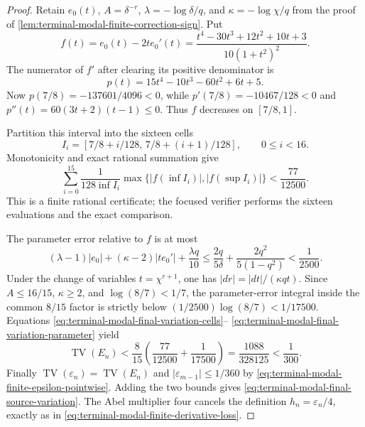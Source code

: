 \begin{proof}
Retain $e_0(t)$, $A=\delta^{-r}$, $\lambda=-\log\delta/q$, and
$\kappa=-\log\chi/q$ from the proof of
\cref{lem:terminal-modal-finite-correction-sign}.  Put
\begin{equation}
 f(t)=e_0(t)-2te_0'(t)
 =\frac{t^4-30t^3+12t^2+10t+3}{10(1+t^2)^2}.
 \label{eq:terminal-modal-final-variation-f}
\end{equation}
The numerator of $f'$ after clearing its positive denominator is
\[
 p(t)=15t^4-10t^3-60t^2+6t+5.
\]
Now $p(7/8)=-137601/4096<0$, while
$p'(7/8)=-10467/128<0$ and
$p''(t)=60(3t+2)(t-1)\le0$.  Thus $f$ decreases on $[7/8,1]$.

Partition this interval into the sixteen cells
\[
 I_i=[7/8+i/128,\,7/8+(i+1)/128],\qquad0\le i<16.
\]
Monotonicity and exact rational summation give
\begin{equation}
 \sum_{i=0}^{15}\frac1{128\inf I_i}
 \max\{|f(\inf I_i)|,|f(\sup I_i)|\}<\frac{77}{12500}.
 \label{eq:terminal-modal-final-variation-cells}
\end{equation}
This is a finite rational certificate; the focused verifier performs the
sixteen evaluations and the exact comparison.

The parameter error relative to $f$ is at most
\begin{equation}
 (\lambda-1)|e_0|+(\kappa-2)|te_0'|+\frac{\lambda q}{10}
 \le\frac{2q}{5\delta}+\frac{2q^2}{5(1-q^2)}<\frac1{2500}.
 \label{eq:terminal-modal-final-variation-parameter}
\end{equation}
Under the change of variables $t=\chi^{r+1}$, one has
$|dr|=|dt|/(\kappa qt)$.  Since $A\le16/15$, $\kappa\ge2$, and
$\log(8/7)<1/7$, the parameter-error integral inside the common
$8/15$ factor is strictly below
$(1/2500)\log(8/7)<1/17500$.  Equations
\eqref{eq:terminal-modal-final-variation-cells}--
\eqref{eq:terminal-modal-final-variation-parameter} yield
\begin{equation}
 \operatorname{TV}(E_n)
 <\frac8{15}\left(\frac{77}{12500}+\frac1{17500}\right)
 =\frac{1088}{328125}<\frac1{300}.
\end{equation}
Finally $\operatorname{TV}(\varepsilon_n)=\operatorname{TV}(E_n)$ and
$|\varepsilon_{m-1}|\le1/360$ by
\eqref{eq:terminal-modal-finite-epsilon-pointwise}.  Adding the two bounds
gives \eqref{eq:terminal-modal-final-source-variation}.  The Abel multiplier
four cancels the definition $h_n=\varepsilon_n/4$, exactly as in
\eqref{eq:terminal-modal-finite-derivative-loss}.
\end{proof}

